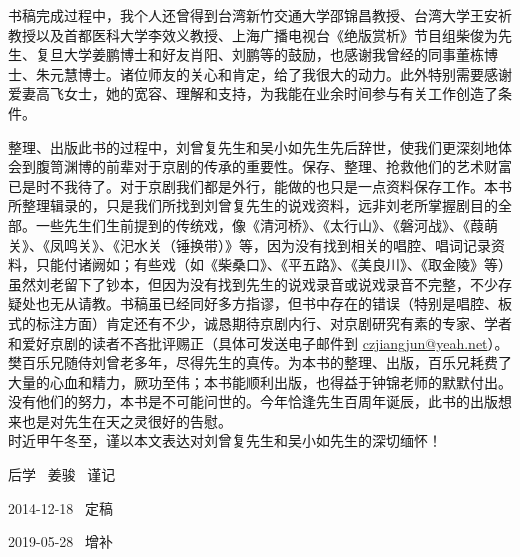 \textrm{书稿完成过程中，我个人还曾得到台湾新竹交通大学邵锦昌教授、台湾大学王安祈教授以及首都医科大学李效义教授、上海广播电视台《绝版赏析》节目组柴俊为先生、复旦大学姜鹏博士和好友肖阳、刘鹏等的鼓励，也感谢我曾经的同事董栋博士、朱元慧博士。诸位师友的关心和肯定，给了我很大的动力。此外特别需要感谢爱妻高飞女士，她的宽容、理解和支持，为我能在业余时间参与有关工作创造了条件。}

\textrm{整理、出版此书的过程中，刘曾复先生和吴小如先生先后辞世，使我们更深刻地体会到腹笥渊博的前辈对于京剧的传承的重要性。保存、整理、抢救他们的艺术财富已是时不我待了。对于京剧我们都是外行，能做的也只是一点资料保存工作。本书所整理辑录的，只是我们所找到刘曾复先生的说戏资料，远非刘老所掌握剧目的全部。一些先生们生前提到的传统戏，像《清河桥》、《太行山》、《磐河战》、《葭萌关》、《凤鸣关》、《汜水关（锤换带）》等，因为没有找到相关的唱腔、唱词记录资料，只能付诸阙如；有些戏（如《柴桑口》、《平五路》、《美良川》、《取金陵》等）虽然刘老留下了钞本，但因为没有找到先生的说戏录音或说戏录音不完整，不少存疑处也无从请教。书稿虽已经同好多方指谬，但}书中存在的错误（特别是唱腔、板式的标注方面）肯定还有不少，诚恳期待京剧内行、对京剧研究有素的专家、学者和爱好京剧的读者不吝批评赐正（具体可发送电子邮件到
\href{mailto:czjiangjun@yeah.net}{{czjiangjun@yeah.net}}）。\\


\textrm{樊百乐兄随侍刘曾老多年，尽得先生的真传。为本书的整理、出版，百乐兄耗费了大量的心血和精力，厥功至伟；本书能顺利出版，也得益于钟锦老师的默默付出。没有他们的努力，本书是不可能问世的。今年恰逢先生百周年诞辰，此书的出版想来也是对先生在天之灵很好的告慰。}\\

\textrm{时近甲午冬至，谨以本文表达对刘曾复先生和吴小如先生的深切缅怀！}

\begin{flushright}
\textrm{后学~ 姜骏~ 谨记~~~}

\textrm{2014-12-18~ 定稿~~}

\textrm{2019-05-28~ 增补~~~}
\end{flushright}


